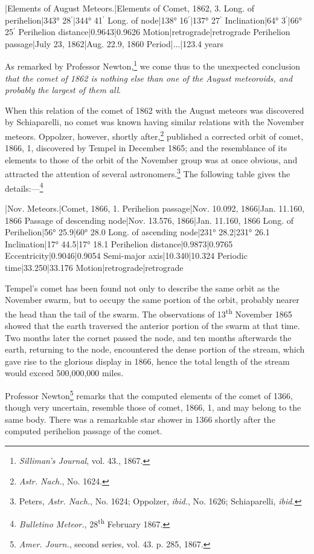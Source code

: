 \documentclass[a4paper, 12pt, oneside, polutonikogreek, english]{article}
\begin{document}
|Elements of August Meteors.|Elements of Comet, 1862, 3. 
Long. of perihelion|343° 28$^{\prime}$|344° 41$^{\prime}$ 
Long. of node|138° 16$^{\prime}$|137° 27$^{\prime}$ 
Inclination|64° 3$^{\prime}$|66° 25$^{\prime}$ 
Perihelion distance|0.9643|0.9626 
Motion|retrograde|retrograde 
Perihelion passage|July 23, 1862|Aug. 22.9, 1860 
Period|...|123.4 years

As remarked by Professor Newton,\footnote{\emph{Silliman's Journal}, vol. 43., 1867.} we come thus to the unexpected conclusion \emph{that the comet of 1862 is nothing else than one of the August meteoroids, and probably the largest of them all}.

When this relation of the comet of 1862 with the August meteors was discovered by Schiaparelli, no comet was known having similar relations with the November meteors. Oppolzer, however, shortly after,\footnote{\emph{Astr. Nach.}, No. 1624.} published a corrected orbit of comet, 1866, 1, discovered by Tempel in December 1865; and the resemblance of its elements to those of the orbit of the November group was at once obvious, and attracted the attention of several astronomers.\footnote{Peters, \emph{Astr. Nach.}, No. 1624; Oppolzer, \emph{ibid.}, No. 1626; Schiaparelli, \emph{ibid.}} The following table gives the details:---\footnote{\emph{Bulletino Meteor.}, 28\textsuperscript{th} February 1867.}

|Nov. Meteors.|Comet, 1866, 1. 
Perihelion passage|Nov. 10.092, 1866|Jan. 11.160, 1866 
Passage of descending node|Nov. 13.576, 1866|Jan. 11.160, 1866 
Long. of Perihelion|56° 25.9|60° 28.0 
Long. of ascending node|231° 28.2|231° 26.1 
Inclination|17° 44.5|17° 18.1 
Perihelion distance|0.9873|0.9765 
Eccentricity|0.9046|0.9054 
Semi-major axis|10.340|10.324 
Periodic time|33.250|33.176 
Motion|retrograde|retrograde

Tempel's comet has been found not only to describe the same orbit as the November swarm, but to occupy the same portion of the orbit, probably nearer the head than the tail of the swarm. The observations of 13\textsuperscript{th} November 1865 showed that the earth traversed the anterior portion of the swarm at that time. Two months later the cornet passed the node, and ten months afterwards the earth, returning to the node, encountered the dense portion of the stream, which gave rise to the glorious display in 1866, hence the total length of the stream would exceed 500,000,000 miles.

Professor Newton\footnote{\emph{Amer. Journ.}, second series, vol. 43. p. 285, 1867.} remarks that the computed elements of the comet of 1366, though very uncertain, resemble those of comet, 1866, 1, and may belong to the same body. There was a remarkable star shower in 1366 shortly after the computed perihelion passage of the comet.
\end{document}
